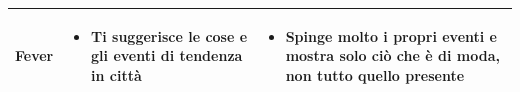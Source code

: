 \begin{table}[h]
\begin{tabular}{|p{3cm}|p{5cm}|p{5cm}|}
        Fever &
        \begin{itemize}[nosep, leftmargin=*]
            \item Ti suggerisce le cose e gli eventi di tendenza in città
        \end{itemize} &
        \begin{itemize}[nosep, leftmargin=*]
            \item Spinge molto i propri eventi e mostra solo ciò che è di moda, non tutto quello presente
        \end{itemize} \\ \hline
        
    \end{tabular}
\end{table}



